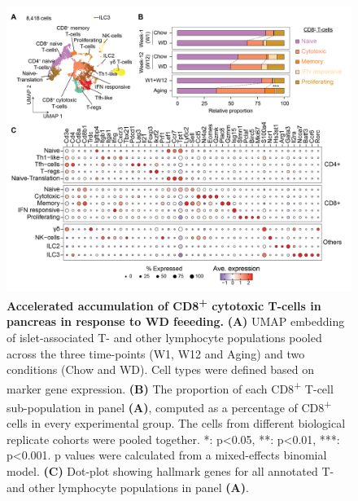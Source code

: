 \begin{figure}[H]
\centering
\includegraphics[width=\linewidth]{Chapter4/Fig/F2-10-01.png}
\caption[res-tcells2]{\textbf{Accelerated accumulation of CD8\textsuperscript{+} cytotoxic T-cells in pancreas in response to WD feeeding.} \textbf{(A)} UMAP embedding of islet-associated T- and other lymphocyte populations pooled across the three time-points (W1, W12 and Aging) and two conditions (Chow and WD). Cell types were defined based on marker gene expression. \textbf{(B)} The proportion of each CD8\textsuperscript{+} T-cell sub-population in panel \textbf{(A)}, computed as a percentage of CD8\textsuperscript{+} cells in every experimental group. The cells from different biological replicate cohorts were pooled together. *: p<0.05, **: p<0.01, ***: p<0.001. p values were calculated from a mixed-effects binomial model. \textbf{(C)} Dot-plot showing hallmark genes for all annotated T- and other lymphocyte populations in panel \textbf{(A)}. 
}
\label{fig:chp2_tcells2}
\end{figure}


